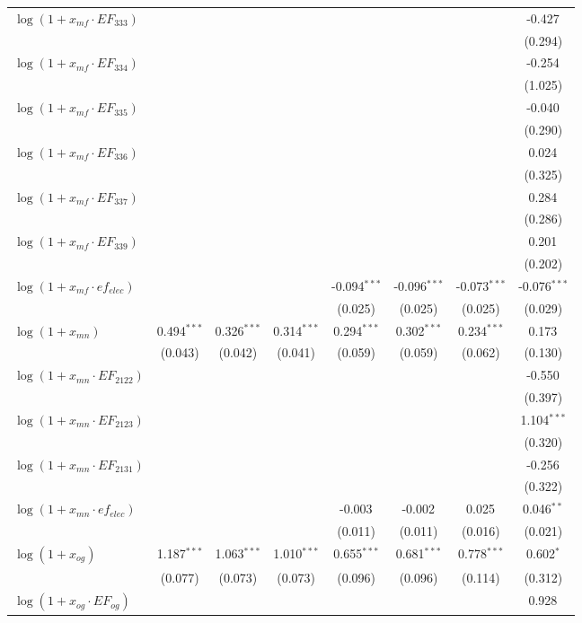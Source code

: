\begin{longtable}[h]{lccccccc}
$\log(1 + x_{mf}\cdot EF_{333})$ & & & & & & & -0.427$^{}$ \\
  & & & & & & & (0.294) \\
 $\log(1 + x_{mf}\cdot EF_{334})$ & & & & & & & -0.254$^{}$ \\
  & & & & & & & (1.025) \\
 $\log(1 + x_{mf}\cdot EF_{335})$ & & & & & & & -0.040$^{}$ \\
  & & & & & & & (0.290) \\
 $\log(1 + x_{mf}\cdot EF_{336})$ & & & & & & & 0.024$^{}$ \\
  & & & & & & & (0.325) \\
 $\log(1 + x_{mf}\cdot EF_{337})$ & & & & & & & 0.284$^{}$ \\
  & & & & & & & (0.286) \\
 $\log(1 + x_{mf}\cdot EF_{339})$ & & & & & & & 0.201$^{}$ \\
  & & & & & & & (0.202) \\
 $\log(1 + x_{mf}\cdot ef_{elec})$ & & & & -0.094$^{***}$ & -0.096$^{***}$ & -0.073$^{***}$ & -0.076$^{***}$ \\
  & & & & (0.025) & (0.025) & (0.025) & (0.029) \\
 $\log(1 + x_{mn})$ & 0.494$^{***}$ & 0.326$^{***}$ & 0.314$^{***}$ & 0.294$^{***}$ & 0.302$^{***}$ & 0.234$^{***}$ & 0.173$^{}$ \\
  & (0.043) & (0.042) & (0.041) & (0.059) & (0.059) & (0.062) & (0.130) \\
 $\log(1 + x_{mn}\cdot EF_{2122})$ & & & & & & & -0.550$^{}$ \\
  & & & & & & & (0.397) \\
 $\log(1 + x_{mn}\cdot EF_{2123})$ & & & & & & & 1.104$^{***}$ \\
  & & & & & & & (0.320) \\
 $\log(1 + x_{mn}\cdot EF_{2131})$ & & & & & & & -0.256$^{}$ \\
  & & & & & & & (0.322) \\
 $\log(1 + x_{mn}\cdot ef_{elec})$ & & & & -0.003$^{}$ & -0.002$^{}$ & 0.025$^{}$ & 0.046$^{**}$ \\
  & & & & (0.011) & (0.011) & (0.016) & (0.021) \\
 $\log(1 + x_{og})$ & 1.187$^{***}$ & 1.063$^{***}$ & 1.010$^{***}$ & 0.655$^{***}$ & 0.681$^{***}$ & 0.778$^{***}$ & 0.602$^{*}$ \\
  & (0.077) & (0.073) & (0.073) & (0.096) & (0.096) & (0.114) & (0.312) \\
 $\log(1 + x_{og}\cdot EF_{og})$ & & & & & & & 0.928$^{}$ \\

\end{longtable}

